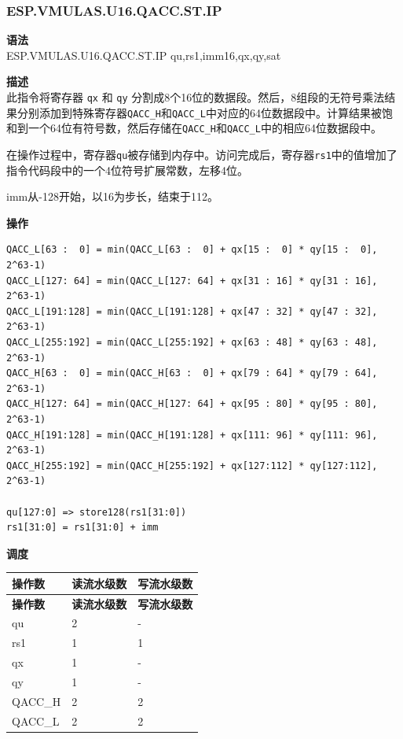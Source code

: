 \newpage

\newpage
\subsubsection{ESP.VMULAS.U16.QACC.ST.IP}\label{instruction:ESPVMULASU16QACCSTIP}
\textbf{语法}\\
ESP.VMULAS.U16.QACC.ST.IP qu,rs1,imm16,qx,qy,sat

\textbf{描述}\\
此指令将寄存器 \lstinline{qx} 和 \lstinline{qy} 分割成8个16位的数据段。然后，8组段的无符号乘法结果分别添加到特殊寄存器\lstinline{QACC_H}和\lstinline{QACC_L}中对应的64位数据段中。计算结果被饱和到一个64位有符号数，然后存储在\lstinline{QACC_H}和\lstinline{QACC_L}中的相应64位数据段中。

在操作过程中，寄存器\lstinline{qu}被存储到内存中。访问完成后，寄存器\lstinline{rs1}中的值增加了指令代码段中的一个4位符号扩展常数，左移4位。

imm从-128开始，以16为步长，结束于112。

\textbf{操作}\\
\begin{lstlisting}
QACC_L[63 :  0] = min(QACC_L[63 :  0] + qx[15 :  0] * qy[15 :  0], 2^63-1)
QACC_L[127: 64] = min(QACC_L[127: 64] + qx[31 : 16] * qy[31 : 16], 2^63-1)
QACC_L[191:128] = min(QACC_L[191:128] + qx[47 : 32] * qy[47 : 32], 2^63-1)
QACC_L[255:192] = min(QACC_L[255:192] + qx[63 : 48] * qy[63 : 48], 2^63-1)
QACC_H[63 :  0] = min(QACC_H[63 :  0] + qx[79 : 64] * qy[79 : 64], 2^63-1)
QACC_H[127: 64] = min(QACC_H[127: 64] + qx[95 : 80] * qy[95 : 80], 2^63-1)
QACC_H[191:128] = min(QACC_H[191:128] + qx[111: 96] * qy[111: 96], 2^63-1)
QACC_H[255:192] = min(QACC_H[255:192] + qx[127:112] * qy[127:112], 2^63-1)

qu[127:0] => store128(rs1[31:0])
rs1[31:0] = rs1[31:0] + imm
\end{lstlisting}

\textbf{调度}\\
\begin{longtable}[c]{|l|l|l|}
    \hline
    \rowcolor{lightgray}
    \textbf{操作数} & \textbf{读流水级数} & \textbf{写流水级数} \\\hline
    \endfirsthead
    \hline
    \rowcolor{lightgray}
     \textbf{操作数} & \textbf{读流水级数} & \textbf{写流水级数} \\\hline
    \endhead
    \hline
    \endfoot

    qu & 2 & - \\\hline
    rs1 & 1 & 1 \\\hline
     qx & 1 & - \\\hline
     qy & 1 & - \\\hline
     QACC\_H & 2 & 2 \\\hline
     QACC\_L & 2 & 2

\end{longtable}


